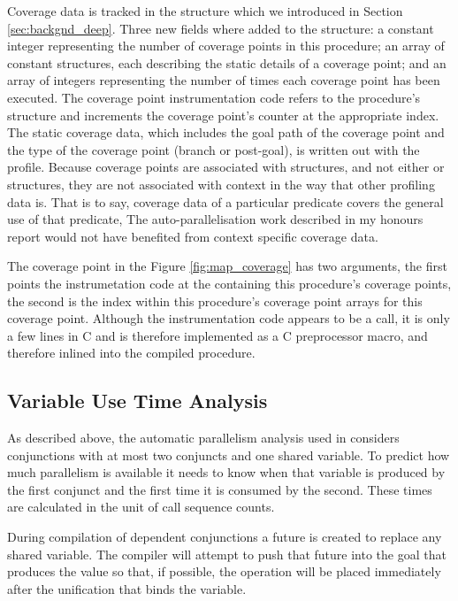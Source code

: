 Coverage data is tracked in the \PS structure
which we introduced in Section \ref{sec:backgnd_deep}.
Three new fields where added to the \PS structure:
a constant integer representing the number of coverage points in this
procedure;
an array of constant structures,
each describing the static details of a coverage point;
and an array of integers representing the number of times each coverage
point has been executed.
The coverage point instrumentation code refers to the procedure's \PS
structure and increments the coverage point's counter at the appropriate index.
The static coverage data,
which includes the goal path of the coverage point and the type of the
coverage point (branch or post-goal),
is written out with the profile.
Because coverage points are associated with \PS structures,
and not either \PD or \CSD structures,
they are not associated with context in the way that other profiling
data is.
That is to say,
coverage data of a particular predicate covers the general use of that
predicate,
The auto-parallelisation work described in my honours report
\citep{pbone_hons}
would not have benefited from context specific coverage data.

The coverage point in the Figure \ref{fig:map_coverage}
has two arguments,
the first points the instrumetation code at the \PS containing
this procedure's coverage points,
the second is the index within this procedure's coverage point arrays
for this coverage point.
Although the instrumentation code appears to be a call,
it is only a few lines in C and is therefore implemented as a C
preprocessor macro, and therefore inlined into the compiled procedure. 


\subsection{Variable Use Time Analysis}
\label{sec:var_use_analysis}

As described above,
the automatic parallelism analysis used in \citet{pbone-hons} considers
conjunctions with at most two conjuncts and one shared variable.
To predict how much parallelism is available it needs to know
when that variable is produced by the first conjunct
and the first time it is consumed by the second.
These times are calculated in the unit of call sequence counts.

During compilation of dependent conjunctions a future is created to
replace any shared variable.
The compiler will attempt to push that future into the goal that
produces the value so that,
if possible,
the \signal operation will be placed immediately after the unification
that binds the variable.

